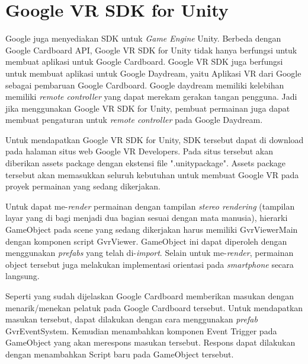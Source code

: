 \section{Google VR SDK for Unity}
 \label{sec:google_vr_sdk_for_unity}
 
 Google juga menyediakan SDK untuk \textit{Game Engine} Unity. Berbeda dengan Google Cardboard API, Google VR SDK for Unity tidak hanya berfungsi untuk membuat aplikasi untuk Google Cardboard. Google VR SDK juga berfungsi untuk membuat aplikasi untuk Google Daydream, yaitu Aplikasi VR dari Google sebagai pembaruan Google Cardboard. Google daydream memiliki kelebihan memiliki \textit{remote controller} yang dapat merekam gerakan tangan pengguna. Jadi jika menggunakan Google VR SDK for Unity, pembuat permainan juga dapat membuat pengaturan untuk \textit{remote controller} pada Google Daydream.
 
 Untuk mendapatkan Google VR SDK for Unity, SDK tersebut dapat di download pada halaman situs web Google VR Developers.\cite{google_vr_developers} Pada situs tersebut akan diberikan assets package dengan ekstensi file ".unitypackage". Assets package tersebut akan memasukkan seluruh kebutuhan untuk membuat Google VR pada proyek permainan yang sedang dikerjakan. 
 
 Untuk dapat me-\textit{render} permainan dengan tampilan \textit{stereo rendering} (tampilan layar yang di bagi menjadi dua bagian sesuai dengan mata manusia), hierarki GameObject pada scene yang sedang dikerjakan harus memiliki GvrViewerMain dengan komponen script GvrViewer. GameObject ini dapat diperoleh dengan menggunakan \textit{prefabs} yang telah di-\textit{import}. Selain untuk me-\textit{render}, permainan object tersebut juga melakukan implementasi orientasi pada \textit{smartphone} secara langsung.
 
 Seperti yang sudah dijelaskan Google Cardboard memberikan masukan dengan menarik/menekan pelatuk pada Google Cardboard tersebut. Untuk mendapatkan masukan tersebut, dapat dilakukan dengan cara menggunakan \textit{prefab} GvrEventSystem. Kemudian menambahkan komponen Event Trigger pada GameObject yang akan merespons masukan tersebut. Respons dapat dilakukan dengan menambahkan Script baru pada GameObject tersebut.